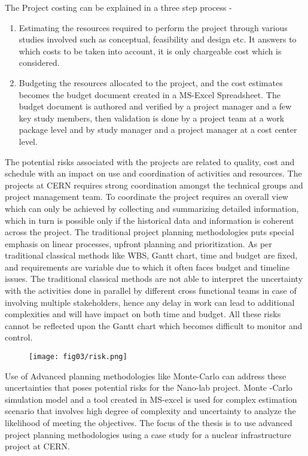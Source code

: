 The Project costing can be explained in a three step process - 

\begin{enumerate}
	\item Estimating the resources required to perform the project through various studies involved such as conceptual, feasibility and design etc. It answers to which costs to be taken into account, it is only chargeable cost which is considered. 
	
	\item Budgeting the resources allocated to the project, and the cost estimates becomes the budget document created in a MS-Excel Spreadsheet. The budget document is authored and verified by a project manager and a few key study members, then validation is done by a project team at a work package level and by study manager and a project manager at a cost center level.
\end{enumerate}

The potential risks associated with the projects are related to quality, cost and schedule with an impact on use and coordination of activities and resources. The projects at CERN requires strong coordination amongst the technical groups and project management team. To coordinate the project requires an overall view which can only be achieved by collecting and summarizing detailed information, which in turn is possible only if the historical data and information is coherent across the project.
The traditional project planning methodologies puts special emphasis on linear processes, upfront planning and prioritization. As per traditional classical methods like WBS, Gantt chart, time and budget are fixed, and requirements are variable due to which it often faces budget and timeline issues. The traditional classical methods are not able to interpret the uncertainty with the activities done in parallel by different cross functional teams in case of involving multiple stakeholders, hence any delay in work can lead to additional complexities and will have impact on both time and budget. All these risks cannot be reflected upon the Gantt chart which becomes difficult to monitor and control. 

	\begin{figure}
	\centering
	\texttt{[image: fig03/risk.png]}
\end{figure}


Use of Advanced planning methodologies like Monte-Carlo can address these uncertainties that poses potential risks for the Nano-lab project. Monte -Carlo simulation model and a tool created in MS-excel is used for complex estimation scenario that involves high degree of complexity and uncertainty to analyze the likelihood of meeting the objectives. The focus of the thesis is to use advanced project planning methodologies using a case study for a nuclear infrastructure project at CERN.


